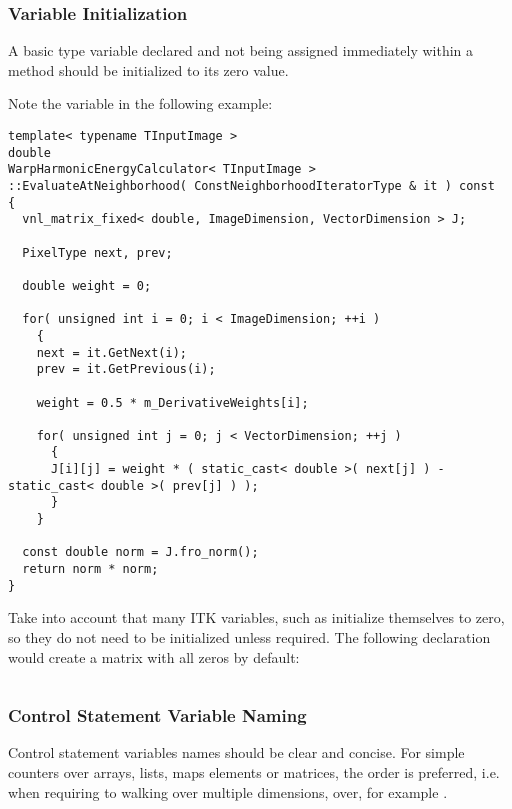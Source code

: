 \subsubsection{Variable Initialization}
\label{subsubsec:VariableInitialization}

A basic type variable declared and not being assigned immediately within a
method should be initialized to its zero value.

Note the  variable in the following example:

\small
\begin{verbatim}
template< typename TInputImage >
double
WarpHarmonicEnergyCalculator< TInputImage >
::EvaluateAtNeighborhood( ConstNeighborhoodIteratorType & it ) const
{
  vnl_matrix_fixed< double, ImageDimension, VectorDimension > J;

  PixelType next, prev;

  double weight = 0;

  for( unsigned int i = 0; i < ImageDimension; ++i )
    {
    next = it.GetNext(i);
    prev = it.GetPrevious(i);

    weight = 0.5 * m_DerivativeWeights[i];

    for( unsigned int j = 0; j < VectorDimension; ++j )
      {
      J[i][j] = weight * ( static_cast< double >( next[j] ) - static_cast< double >( prev[j] ) );
      }
    }

  const double norm = J.fro_norm();
  return norm * norm;
}
\end{verbatim}
\normalsize

Take into account that many ITK variables, such as  initialize
themselves to zero, so they do not need to be initialized unless required. The
following declaration would create a matrix with all zeros by default:
\small
\begin{verbatim}

\end{verbatim}
\normalsize


\subsubsection{Control Statement Variable Naming}
\label{subsubsec:ControlStatementVariableNaming}

Control statement variables names should be clear and concise. For simple
counters over arrays, lists, maps elements or matrices, the 
order is preferred, i.e. when requiring to walking over multiple dimensions,
over, for example .

